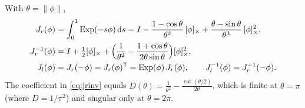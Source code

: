 \begin{theorem}
\label{thm:jr}
With $\theta = \|\phi\|$,
\begin{align}
  J_r(\phi) &= \int_0^1 \operatorname{Exp}(-s\phi)\,\mathrm{d} s
             = I - \frac{1-\cos\theta}{\theta^2}\,[\phi]_{\times} + \frac{\theta - \sin\theta}{\theta^3}\,[\phi]_{\times}^2, \label{eq:jr}\\
  J_r^{-1}(\phi) &= I + \tfrac12[\phi]_{\times} + \Big(\frac{1}{\theta^2} - \frac{1 + \cos\theta}{2\theta\sin\theta}\Big)[\phi]_{\times}^2, \label{eq:jrinv}\\
  J_l(\phi) &= J_r(-\phi) = J_r(\phi)^{\mathsf{T}} = \operatorname{Exp}(\phi)\,J_r(\phi), \qquad J_l^{-1}(\phi) = J_r^{-1}(-\phi). \label{eq:jl}
\end{align}
The coefficient in \eqref{eq:jrinv} equals $D(\theta) = \frac{1}{\theta^2} - \frac{\cot(\theta/2)}{2\theta}$,
which is finite at $\theta = \pi$ (where $D = 1/\pi^2$) and singular only at $\theta = 2\pi$.
\end{theorem}
